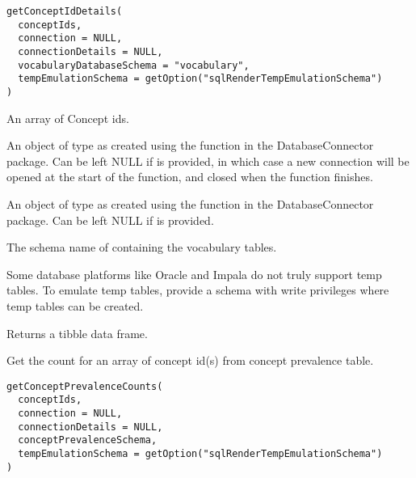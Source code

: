 \documentclass[a4paper]{book}
\begin{document}
%
\begin{Usage}
\begin{verbatim}
getConceptIdDetails(
  conceptIds,
  connection = NULL,
  connectionDetails = NULL,
  vocabularyDatabaseSchema = "vocabulary",
  tempEmulationSchema = getOption("sqlRenderTempEmulationSchema")
)
\end{verbatim}
\end{Usage}
%
\begin{Arguments}
\begin{ldescription}
\item[\code{conceptIds}] An array of Concept ids.

\item[\code{connection}] An object of type  as created using the
 function in the
DatabaseConnector package. Can be left NULL if 
is provided, in which case a new connection will be opened at the start
of the function, and closed when the function finishes.

\item[\code{connectionDetails}] An object of type  as created using the
 function in the
DatabaseConnector package. Can be left NULL if  is
provided.

\item[\code{vocabularyDatabaseSchema}] The schema name of containing the vocabulary tables.

\item[\code{tempEmulationSchema}] Some database platforms like Oracle and Impala do not truly support temp tables. To emulate temp 
tables, provide a schema with write privileges where temp tables can be created.
\end{ldescription}
\end{Arguments}
%
\begin{Value}
Returns a tibble data frame.
\end{Value}
%
\begin{Description}\relax
Get the count for an array of concept id(s) from concept prevalence table.
\end{Description}
%
\begin{Usage}
\begin{verbatim}
getConceptPrevalenceCounts(
  conceptIds,
  connection = NULL,
  connectionDetails = NULL,
  conceptPrevalenceSchema,
  tempEmulationSchema = getOption("sqlRenderTempEmulationSchema")
)
\end{verbatim}
\end{Usage}
\end{document}
